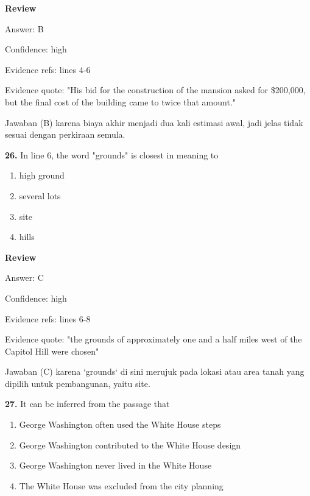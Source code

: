 \documentclass[12pt]{article}
\begin{document}
\par
\begingroup
\setlength{\parskip}{0pt}
\setlength{\parindent}{0pt}
\textbf{Review}\par
Answer: B\par
Confidence: high\par
Evidence refs: lines 4-6\par
Evidence quote: "His bid for the construction of the mansion asked for \$200,000, but the final cost of the building came to twice that amount."\par
Jawaban (B) karena biaya akhir menjadi dua kali estimasi awal, jadi jelas tidak sesuai dengan perkiraan semula.\par
\endgroup
\par
\vspace{0.25\baselineskip}
\noindent\textbf{26.} In line 6, the word "grounds" is closest in meaning to
\begin{enumerate}[label=(\Alph*),leftmargin=*,itemsep=0.2em]
\item high ground
\item several lots
\item site
\item hills
\end{enumerate}
\par
\begingroup
\setlength{\parskip}{0pt}
\setlength{\parindent}{0pt}
\textbf{Review}\par
Answer: C\par
Confidence: high\par
Evidence refs: lines 6-8\par
Evidence quote: "the grounds of approximately one and a half miles west of the Capitol Hill were chosen"\par
Jawaban (C) karena `grounds` di sini merujuk pada lokasi atau area tanah yang dipilih untuk pembangunan, yaitu site.\par
\endgroup
\par
\vspace{0.25\baselineskip}
\noindent\textbf{27.} It can be inferred from the passage that
\begin{enumerate}[label=(\Alph*),leftmargin=*,itemsep=0.2em]
\item George Washington often used the White House steps
\item George Washington contributed to the White House design
\item George Washington never lived in the White House
\item The White House was excluded from the city planning
\end{enumerate}
\end{document}
